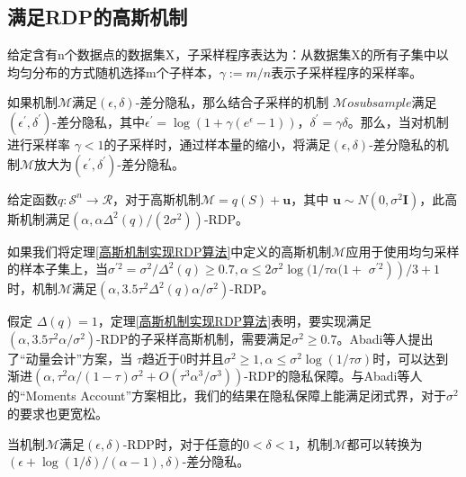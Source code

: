 \subsection{满足RDP的高斯机制}
\begin{theorem}\label{子采样}
给定含有n个数据点的数据集X，子采样程序表达为：从数据集X的所有子集中以均匀分布的方式随机选择m个子样本，$\gamma:=m / n$表示子采样程序的采样率。
\end{theorem}

如果机制$\mathcal{M}$满足$(\epsilon, \delta)$-差分隐私，那么结合子采样的机制 $\mathcal{M}  o   subsample$满足$\left(\epsilon^{\prime}, \delta^{\prime}\right)$-差分隐私，其中$\epsilon^{\prime}=\log \left(1+\gamma\left(e^{\epsilon}-1\right)\right)$，$\delta^{\prime}=\gamma \delta$。那么，当对机制进行采样率 $\gamma<1$的子采样时，通过样本量的缩小，将满足$(\epsilon, \delta)$-差分隐私的机制$\mathcal{M}$放大为$\left(\epsilon^{\prime}, \delta^{\prime}\right)$-差分隐私。

\begin{theorem}\label{高斯机制实现RDP算法}
给定函数$q: \mathcal{S}^{n} \rightarrow \mathcal{R}$，对于高斯机制$\mathcal{M}=q(S)+\mathbf{u}$，其中 $\mathbf{u} \sim N\left(0, \sigma^{2} \mathbf{I}\right)$，此高斯机制满足$\left(\alpha, \alpha \Delta^{2}(q) /\left(2 \sigma^{2}\right)\right)$-RDP。
\end{theorem}

如果我们将定理\ref{高斯机制实现RDP算法}中定义的高斯机制$\mathcal{M}$应用于使用均匀采样的样本子集上，当$\sigma^{\prime 2}=\sigma^{2} / \Delta^{2}(q) \geq 0.7, \alpha \leq 2 \sigma^{2} \log (1 / \tau \alpha(1+$ $\left.\left.\sigma^{\prime 2}\right)\right) / 3+1$时，机制$\mathcal{M}$满足$\left(\alpha, 3.5 \tau^{2} \Delta^{2}(q) \alpha / \sigma^{2}\right)$-RDP。

假定 $\Delta(q)=1$，定理\ref{高斯机制实现RDP算法}表明，要实现满足 $\left(\alpha, 3.5 \tau^{2} \alpha / \sigma^{2}\right)$-RDP的子采样高斯机制，需要满足$\sigma^{2} \geq 0.7$。Abadi等人提出了“动量会计”方案，当 $\tau$趋近于0时并且$\sigma^{2} \geq 1, \alpha \leq \sigma^{2} \log (1 / \tau \sigma)$时，可以达到渐进$\left(\alpha, \tau^{2} \alpha /(1-\tau) \sigma^{2}+O\left(\tau^{3} \alpha^{3} / \sigma^{3}\right)\right)$-RDP的隐私保障。与Abadi等人的“Moments Account”方案相比，我们的结果在隐私保障上能满足闭式界，对于$\sigma^{2}$的要求也更宽松。

\begin{theorem}\label{RDP向DP的转换}
当机制$\mathcal{M}$满足$(\epsilon, \delta)$-RDP时，对于任意的$0<\delta<1$，机制$\mathcal{M}$都可以转换为$(\epsilon+\log (1 / \delta) /(\alpha-1), \delta)$-差分隐私。
\end{theorem}

